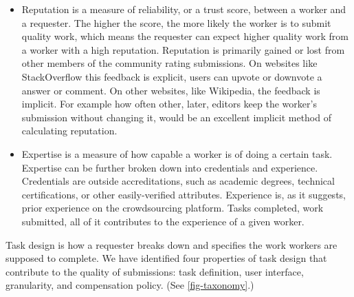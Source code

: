 \documentclass[9pt,twocolumn]{article}
\begin{document}
	\begin{itemize}
	\item Reputation is a measure of reliability, or a trust score, between a worker and a requester. The higher the score, the more likely the worker is to submit quality work, which means the requester can expect higher quality work from a worker with a high reputation. Reputation is primarily gained or lost from other members of the community rating submissions. \cite{de2011reputation} On websites like StackOverflow this feedback is explicit, users can upvote or downvote a answer or comment. On other websites, like Wikipedia, the feedback is implicit. For example how often other, later, editors keep the worker's submission without changing it, would be an excellent implicit method of calculating reputation. 
	
	\item Expertise is a measure of how capable a worker is of doing a certain task. \cite{schall2012expert} Expertise can be further broken down into credentials and experience. Credentials are outside accreditations, such as academic degrees, technical certifications, or other easily-verified attributes. Experience is, as it suggests, prior experience on the crowdsourcing platform. Tasks completed, work submitted, all of it contributes to the experience of a given worker. 
	\end{itemize}

	Task design is how a requester breaks down and specifies the work workers are supposed to complete. We have identified four properties of task design that contribute to the quality of submissions: task definition, user interface, granularity, and compensation policy. (See \cref{fig-taxonomy}.)
	
\end{document}
